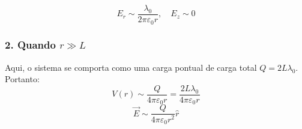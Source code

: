 \documentclass[a4paper,12pt]{article}
\begin{document}
\begin{equation}
\boxed{
E_r \sim \frac{\lambda_0}{2\pi\varepsilon_0 r}, \quad E_z \sim 0
}
\end{equation}

\subsubsection*{2. Quando \( r \gg L \)}

Aqui, o sistema se comporta como uma carga pontual de carga total \( Q = 2L\lambda_0 \). Portanto:
\begin{equation}
\boxed{
V(r) \sim \frac{Q}{4\pi\varepsilon_0 r} = \frac{2L\lambda_0}{4\pi\varepsilon_0 r}
}
\end{equation}
\begin{equation}
\boxed{
\vec{E} \sim \frac{Q}{4\pi\varepsilon_0 r^2} \hat{r}
}
\end{equation}
\end{document}
